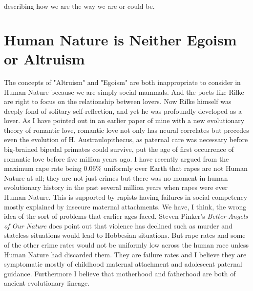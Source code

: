 \documentclass{amsart}
\begin{document}
describing how we are the way we are or could be.   

\section{Human Nature is Neither Egoism or Altruism}

The concepts of "Altruism" and "Egoism" are both inappropriate to consider in Human Nature because we are simply social mammals.  And the poets like Rilke are right to focus on the relationship between lovers.  Now Rilke himself was deeply fond of solitary self-reflection, and yet he was profoundly developed as a lover.  As I have pointed out in an earlier paper of mine with a new evolutionary theory of romantic love, romantic love not only has neural correlates but precedes even the evolution of H. Austraulopithecus, as paternal care was necessary before big-brained bipedal primates could survive, put the age of first occurrence of romantic love before five million years ago.  I have recently argued from the maximum rape rate being 0.06\% uniformly over Earth that rapes are not Human Nature at all; they are not just crimes but there was no moment in human evolutionary history in the past several million years when rapes were ever Human Nature.  This is supported by rapists having failures in social competency mostly explained by insecure maternal attachments.  We have, I think, the wrong idea of the sort of problems that earlier ages faced.  Steven Pinker's {\em Better Angels of Our Nature} does point out that violence has declined such as murder and stateless situations would lead to Hobbesian situations.  But rape rates and some of the other crime rates would not be uniformly low across the human race unless Human Nature had discarded them. They are failure rates and I believe they are symptomatic mostly of childhood maternal attachment and adolescent paternal guidance.  Furthermore I believe that motherhood and fatherhood are both of ancient evolutionary lineage.  
\end{document}
